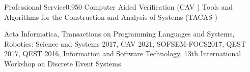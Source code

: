 \documentclass{federico_cv}
\begin{document}
\begin{tblSubSection}{Professional Service}{0.95}{0}
{Computer Aided Verification (CAV )}
{Tools and Algorithms for the Construction and Analysis of Systems (TACAS )}

{Acta Informatica, Transactions on Programming Languages and Systems, Robotics: Science and Systems 2017, CAV 2021, SOFSEM-FOCS2017, QEST 2017, QEST 2016, Information and Software Technology, 13th International Workshop on Discrete Event Systems}

\end{tblSubSection}
\end{document}
